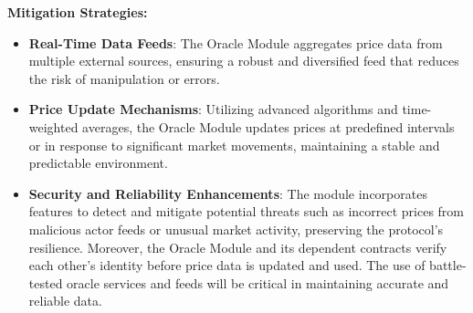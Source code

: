 \textbf{Mitigation Strategies:}
\begin{itemize}
    \item \textbf{Real-Time Data Feeds}: The Oracle Module aggregates price data from multiple external sources, ensuring a robust and diversified feed that reduces the risk of manipulation or errors.
    \item \textbf{Price Update Mechanisms}: Utilizing advanced algorithms and time-weighted averages, the Oracle Module updates prices at predefined intervals or in response to significant market movements, maintaining a stable and predictable environment.
    \item \textbf{Security and Reliability Enhancements}: The module incorporates features to detect and mitigate potential threats such as incorrect prices from malicious actor feeds or unusual market activity, preserving the protocol's resilience. Moreover, the Oracle Module and its dependent contracts verify each other’s identity before price data is updated and used. The use of battle-tested oracle services and feeds will be critical in maintaining accurate and reliable data.
\end{itemize}
